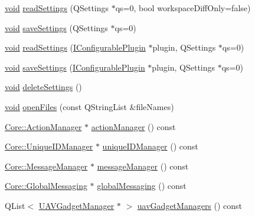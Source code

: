 \begin{DoxyCompactItemize}
\item 
\hyperlink{group___u_a_v_objects_plugin_ga444cf2ff3f0ecbe028adce838d373f5c}{void} \hyperlink{group___core_plugin_gadef90c414cbb6c8ddb7bd051ac4f6dd3}{read\-Settings} (\-Q\-Settings $\ast$qs=0, bool workspace\-Diff\-Only=false)
\item 
\hyperlink{group___u_a_v_objects_plugin_ga444cf2ff3f0ecbe028adce838d373f5c}{void} \hyperlink{group___core_plugin_ga1400c8a8dc0525a89892b399cdbe00dd}{save\-Settings} (\-Q\-Settings $\ast$qs=0)
\item 
\hyperlink{group___u_a_v_objects_plugin_ga444cf2ff3f0ecbe028adce838d373f5c}{void} \hyperlink{group___core_plugin_ga73d4a9b5000444898214e4cd5e9c4ba2}{read\-Settings} (\hyperlink{class_core_1_1_i_configurable_plugin}{\-I\-Configurable\-Plugin} $\ast$plugin, \-Q\-Settings $\ast$qs=0)
\item 
\hyperlink{group___u_a_v_objects_plugin_ga444cf2ff3f0ecbe028adce838d373f5c}{void} \hyperlink{group___core_plugin_gabaed765ca937cc2a9a6656707af51b73}{save\-Settings} (\hyperlink{class_core_1_1_i_configurable_plugin}{\-I\-Configurable\-Plugin} $\ast$plugin, \-Q\-Settings $\ast$qs=0)
\item 
\hyperlink{group___u_a_v_objects_plugin_ga444cf2ff3f0ecbe028adce838d373f5c}{void} \hyperlink{group___core_plugin_ga3bc533033d8d849099ecd1d2bb5d7b6f}{delete\-Settings} ()
\item 
\hyperlink{group___u_a_v_objects_plugin_ga444cf2ff3f0ecbe028adce838d373f5c}{void} \hyperlink{group___core_plugin_ga26342c43079bad17c540757728d3f897}{open\-Files} (const \-Q\-String\-List \&file\-Names)
\item 
\hyperlink{class_core_1_1_action_manager}{\-Core\-::\-Action\-Manager} $\ast$ \hyperlink{group___core_plugin_gab47ff8e0a661aec0be5a11339f13bdf0}{action\-Manager} () const 
\item 
\hyperlink{class_core_1_1_unique_i_d_manager}{\-Core\-::\-Unique\-I\-D\-Manager} $\ast$ \hyperlink{group___core_plugin_gaa5443b3dddc907144dda5a741fa107e1}{unique\-I\-D\-Manager} () const 
\item 
\hyperlink{class_core_1_1_message_manager}{\-Core\-::\-Message\-Manager} $\ast$ \hyperlink{group___core_plugin_ga56d56321cb281f54cc235519ea59a8ad}{message\-Manager} () const 
\item 
\hyperlink{class_core_1_1_global_messaging}{\-Core\-::\-Global\-Messaging} $\ast$ \hyperlink{group___core_plugin_ga36cb88f703fd8e9cc4662216ba0c9967}{global\-Messaging} () const 
\item 
\-Q\-List$<$ \hyperlink{class_core_1_1_u_a_v_gadget_manager}{\-U\-A\-V\-Gadget\-Manager} $\ast$ $>$ \hyperlink{group___core_plugin_ga709d0285d98b057ef104765fb89e18f9}{uav\-Gadget\-Managers} () const 

\end{DoxyCompactItemize}

